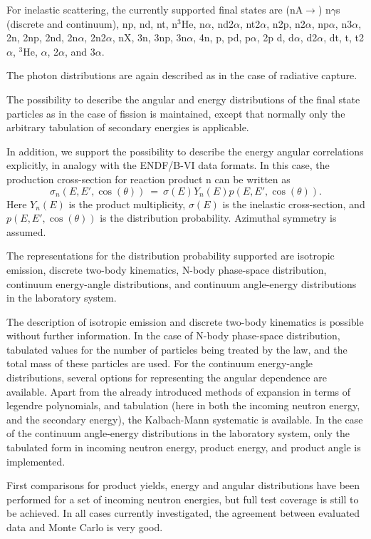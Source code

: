 For inelastic scattering, the currently supported final states are (nA$\rightarrow$)
n$\gamma$s (discrete and continuum), np, nd, nt, n$^3$He, n$\alpha$, nd2$\alpha$,
nt2$\alpha$, n2p, n2$\alpha$, np$\alpha$, n3$\alpha$, 2n, 2np,
2nd, 2n$\alpha$, 2n2$\alpha$, nX, 3n, 3np, 3n$\alpha$, 4n, p,
pd, p$\alpha$, 2p d, d$\alpha$, d2$\alpha$, dt, t, t2$\alpha$,
$^3$He, $\alpha$, 2$\alpha$, and 3$\alpha$.

The photon distributions are again described as in the case of 
radiative capture. 

The 
possibility to describe the angular and energy distributions of the final 
state particles as in the case of fission is maintained, except that normally
only the arbitrary tabulation of secondary energies is applicable. 

In addition, we support the possibility to describe the energy angular
correlations explicitly, in analogy with the ENDF/B-VI data formats. 
In this case, the production cross-section for
reaction product n can be written as
$$\sigma_n(E, E', \cos(\theta))~=~\sigma(E)Y_n(E)p(E, E', \cos(\theta)).$$
Here $Y_n(E)$ is the product multiplicity, $\sigma(E)$ is the inelastic
cross-section, and $p(E, E', \cos(\theta))$ is the distribution probability.
Azimuthal symmetry is assumed.

The representations for the distribution probability supported are isotropic
emission, discrete two-body kinematics, N-body phase-space distribution, 
continuum energy-angle distributions, and continuum angle-energy distributions 
in the laboratory system.

The description of isotropic emission and discrete two-body kinematics is
possible without further information. In the case of N-body phase-space 
distribution, tabulated values for the number of particles being treated by the
law, and the total mass of these particles are used.
For the continuum energy-angle distributions, several options for representing
the angular dependence are available. Apart from the already introduced methods
of expansion in terms of legendre polynomials, and tabulation (here in
both the incoming neutron energy, and the secondary energy), the Kalbach-Mann
systematic is available.
In the case of the continuum angle-energy distributions 
in the laboratory system, only the tabulated form in incoming neutron energy,
product energy, and product angle is implemented.

First comparisons for product yields, energy and angular distributions have
been performed for a set of incoming neutron energies, but full test coverage
is still to be achieved.
In all cases currently investigated, the agreement between evaluated data and 
Monte Carlo is very good.
